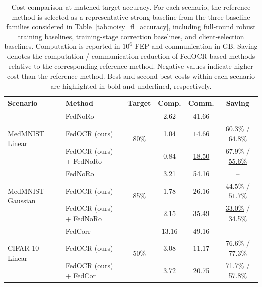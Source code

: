 ﻿\documentclass[conference]{IEEEtran}
\theoremstyle{definition}
\theoremstyle{remark}
\begin{document}
\begin{table}[!t]
	\centering
	\caption{\normalfont Cost comparison at matched target accuracy. For each scenario, the reference method is selected as a representative strong baseline from the three baseline families considered in Table~\ref{tab:noisy_fl_accuracy}, including full-round robust training baselines, training-stage correction baselines, and client-selection baselines. Computation is reported in $10^6$ FEP and communication in GB. Saving denotes the computation / communication reduction of FedOCR-based methods relative to the corresponding reference method. Negative values indicate higher cost than the reference method. Best and second-best costs within each scenario are highlighted in bold and underlined, respectively.}
	\label{tab:efficiency_linear}
	\setlength{\tabcolsep}{4.5pt}
	\renewcommand{\arraystretch}{1.12}
	\begin{tabular}{llcccc}
		\toprule
		\textbf{Scenario} & \textbf{Method} & \textbf{Target} & \textbf{Comp.} & \textbf{Comm.} & \textbf{Saving} \\
		\midrule
		\multirow{3}{*}{MedMNIST Linear} 
		& FedNoRo & \multirow{3}{*}{80\%} & 2.62 & 41.66 & -- \\
		& FedOCR (ours) & & \underline{1.04} & $\boldsymbol{14.66}$ & \underline{60.3\%} / $\boldsymbol{64.8\%}$ \\
		& FedOCR (ours) + FedNoRo & & $\boldsymbol{0.84}$ & \underline{18.50} & $\boldsymbol{67.9\%}$ / \underline{55.6\%} \\
		\midrule
		
		\multirow{3}{*}{MedMNIST Gaussian} 
		& FedNoRo & \multirow{3}{*}{85\%} & 3.21 & 54.16 & -- \\
		& FedOCR (ours) & & $\boldsymbol{1.78}$ & $\boldsymbol{26.16}$ & $\boldsymbol{44.5\%}$ / $\boldsymbol{51.7\%}$ \\
		& FedOCR (ours) + FedNoRo & & \underline{2.15} & \underline{35.49} & \underline{33.0\%} / \underline{34.5\%} \\
		\midrule
		
		\multirow{3}{*}{CIFAR-10 Linear} 
		& FedCorr & \multirow{3}{*}{50\%} & 13.16 & 49.16 & -- \\
		& FedOCR (ours) & & $\boldsymbol{3.08}$ & $\boldsymbol{11.17}$ & $\boldsymbol{76.6\%}$ / $\boldsymbol{77.3\%}$ \\
		& FedOCR (ours) + FedCor & & \underline{3.72} & \underline{20.75} & \underline{71.7\%} / \underline{57.8\%} \\
		\midrule
		

\end{tabular}
\end{table}
\end{document}
